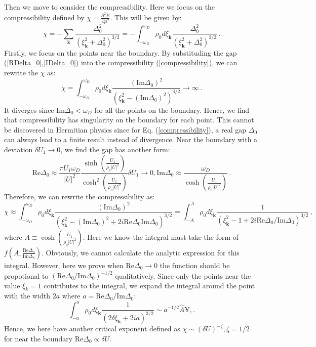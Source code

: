 \documentclass[aps,onecolumn,nofootinbib,superscriptaddress,notitlepage,longbibliography]{revtex4-1}
\begin{document}
Then we move to consider the compressibility. Here we focus on the
compressibility defined by $\chi=\frac{\partial^{2}E}{\partial\mu^{2}}$.
This will be given by: 
\begin{equation}
\chi=-\sum_{\bm{k}}\frac{\Delta_{0}^{2}}{(\xi_{\bm{k}}^{2}+\Delta_{0}^{2})^{3/2}}=-\int_{-\omega_{D}}^{\omega_{D}}\rho_{0}d\xi_{\bm{k}}\frac{\Delta_{0}^{2}}{(\xi_{\bm{k}}^{2}+\Delta_{0}^{2})^{3/2}}\,.\label{compressibility}
\end{equation}
Firstly, we focus on the points near the boundary. By substituding
the gap (\ref{RDelta_0},\ref{IDelta_0}) into the compressibility
(\ref{compressibility}), we can rewrite the $\chi$ as: 
\begin{equation}
\chi=\int_{-\omega_{D}}^{\omega_{D}}\rho_{0}d\xi_{\bm{k}}\frac{(\text{Im}\Delta_{0})^{2}}{(\xi_{\bm{k}}^{2}-(\text{Im}\Delta_{0})^{2})^{3/2}}\rightarrow\infty\,.
\end{equation}
It diverges since $\text{Im}\Delta_{0}<\omega_{D}$ for all the points
on the boundary. Hence, we find that compressibility has singularity
on the boundary for each point. This cannot be discovered in Hermitian
physics since for Eq. (\ref{compressibility}), a real gap $\Delta_{0}$
can always lead to a finite result instead of divergence. Near the
boundary with a deviation $\delta U_{1}\rightarrow0$, we find the
gap has another form: 
\begin{equation}
\text{Re}\Delta_{0}\approx\frac{\pi U_{1}\omega_{D}}{|U|^{2}}\frac{\sinh\left(\frac{U_{1}}{\rho_{0}|U|^{2}}\right)}{\cosh^{2}\left(\frac{U_{1}}{\rho_{0}|U|^{2}}\right)}\delta U_{1}\rightarrow0,\text{Im}\Delta_{0}\approx\frac{\omega_{D}}{\cosh\left(\frac{U_{1}}{\rho_{0}|U|^{2}}\right)}\,.
\end{equation}
Therefore, we can rewrite the compressibility as: 
\begin{equation}
\chi\approx\int_{-\omega_{D}}^{\omega_{D}}\rho_{0}d\xi_{\bm{k}}\frac{(\text{Im}\Delta_{0})^{2}}{(\xi_{\bm{k}}^{2}-(\text{Im}\Delta_{0})^{2}+2i\text{Re}\Delta_{0}\text{Im}\Delta_{0})^{3/2}}=\int_{-A}^{A}\rho_{0}d\xi_{\bm{k}}\frac{1}{(\xi_{\bm{k}}^{2}-1+2i\text{Re}\Delta_{0}/\text{Im}\Delta_{0})^{3/2}}\,,
\end{equation}
where $A\equiv\cosh\left(\frac{U_{1}}{\rho_{0}|U|^{2}}\right)$. Here
we know the integral must take the form of $f\left(A,\frac{\text{Re}\Delta_{0}}{\text{Im}\Delta_{0}}\right)$.
Obviously, we cannot calculate the analytic expression for this integral.
However, here we prove when $\text{Re}\Delta_{0}\rightarrow0$ the
function should be propotional to $(\text{Re}\Delta_{0}/\text{Im}\Delta_{0})^{-1/2}$
qualitatively. Since only the points near the value $\xi_{k}=1$ contributes
to the integral, we expand the integral around the point with the
width $2a$ where $a=\text{Re}\Delta_{0}/\text{Im}\Delta_{0}$: 
\begin{equation}
\int_{-a}^{a}\rho_{0}d\xi_{\bm{k}}\frac{1}{(2\delta\xi_{\bm{k}}+2ia)^{3/2}}\sim a^{-1/2}\hat{A}\yen,.
\end{equation}
Hence, we here have another critical exponent defined as $\chi\sim(\delta U)^{-\zeta},\zeta=1/2$
for near the boundary $\text{Re}\Delta_{0}\propto\delta U$.
\end{document}
